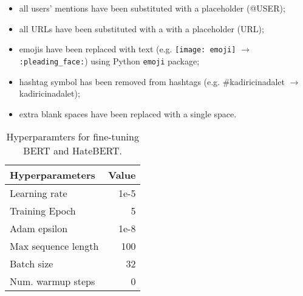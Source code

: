 \documentclass[11pt]{article}
\begin{document}
\begin{itemize}
    \item all users' mentions have been substituted with a placeholder (@USER);
    \item all URLs have been substituted with a with a placeholder (URL);
    \item emojis have been replaced with text (e.g. \texttt{[image: emoji]} $\rightarrow$ \texttt{:pleading\_face:}) using Python \texttt{emoji} package;
    \item hashtag symbol has been removed from hashtags (e.g. \#kadiricinadalet $\rightarrow$ kadiricinadalet);
    \item extra blank spaces have been replaced with a single space.
\end{itemize}

\begin{table}[!tbh]
    \centering
    \begin{tabular}{lr}
    \toprule
        \bf Hyperparameters &  \bf Value  
        \\ \midrule
         Learning rate & 1e-5 \\  
         Training Epoch & 5 \\
         Adam epsilon & 1e-8 \\
         Max sequence length & 100 \\
         Batch size & 32 \\
         Num. warmup steps & 0 \\
    \end{tabular}
    \caption{Hyperparamters for fine-tuning BERT and HateBERT.}
    \label{tab:hyper}
\end{table}
\end{document}
